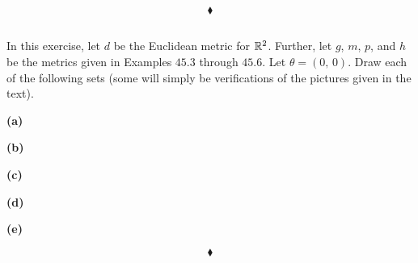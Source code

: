 $$\blacklozenge$$
\newpage


\renewcommand{\thesubsection}{\thesection.\arabic{subsection}}
\setcounter{subsection}{0}
\subsection{}
\begin{tcolorbox}
In this exercise, let $d$ be the Euclidean metric for $\mathbb{R}^2$. Further, let $g$, $m$, $p$, and $h$ be the metrics given in Examples $45.3$ through $45.6$. Let $\theta=(0,\, 0)$. Draw each of the following sets (some will simply be verifications of the pictures given in the text).
\end{tcolorbox}
\textbf{(a)}
\begin{figure}[H]%
    \centering
    \subfloat[$N_d(\theta;1)$ ]{}
    \subfloat[$B_d(\theta;1)$]{}
\label{fig:fig_p8b}
\end{figure}
\textbf{(b)}
\begin{figure}[H]%
    \centering
    \subfloat[$N_g(\theta;1)$ ]{}
    \subfloat[$B_g(\theta;1)$]{}
\label{fig:fig_p8b}
\end{figure}
\textbf{(c)}
\begin{figure}[H]%
    \centering
    \subfloat[$N_m(\theta;1)$]{}
        \subfloat[$B_m(\theta;1)$]{}
\label{fig:fig_p8b}
\end{figure}
\textbf{(d)}
\begin{figure}[H]%
    \centering
    \subfloat[$N_p(\theta;1)$ ]{}
    \subfloat[$B_p(\theta;1)$]{}
\label{fig:fig_p8b}
\end{figure}
\textbf{(e)}
\begin{figure}[H]%
    \centering
    \subfloat[$N_h(\theta;1)$ ]{}
    \subfloat[$B_h(\theta;1)$]{}
\label{fig:fig_p8b}
\end{figure}
$$\blacklozenge$$

\newpage
